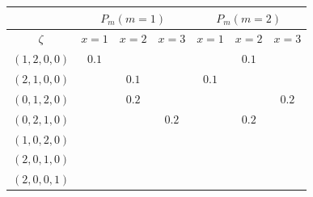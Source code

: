\documentclass[11pt,letterpaper]{article}
\begin{document}
\begin{table}[]
\begin{tabular}{c||ccc||ccc}
            & \multicolumn{3}{c||}{$P_m (m=1)$}                                                            & \multicolumn{3}{c}{$P_m (m=2)$}                                                                          \\ \hline
$\zeta$     & \multicolumn{1}{c|}{$x=1$}                                           & \multicolumn{1}{c|}{$x=2$}                    & $x=3$                    & \multicolumn{1}{c|}{$x=1$}                    & \multicolumn{1}{c|}{$x=2$}                    & $x=3$                    \\ \hline
$(1,2,0,0)$ & \multicolumn{1}{c|}{\cellcolor{yellow!25}$0.1$} & \multicolumn{1}{c|}{}                         &                          & \multicolumn{1}{c|}{}                         & \multicolumn{1}{c|}{\cellcolor{yellow!25}$0.1$} &                          \\ \hline
$(2,1,0,0)$ & \multicolumn{1}{c|}{}                                                & \multicolumn{1}{c|}{\cellcolor{yellow!25}$0.1$} &                          & \multicolumn{1}{c|}{\cellcolor{yellow!25}$0.1$} & \multicolumn{1}{c|}{}                         &                          \\ \hline
$(0,1,2,0)$ & \multicolumn{1}{c|}{}                                                & \multicolumn{1}{c|}{\cellcolor{yellow!25}$0.2$} &                          & \multicolumn{1}{c|}{}                         & \multicolumn{1}{c|}{}                         & \cellcolor{yellow!25}$0.2$ \\ \hline
$(0,2,1,0)$ & \multicolumn{1}{c|}{}                                                & \multicolumn{1}{c|}{}                         & \cellcolor{yellow!25}$0.2$ & \multicolumn{1}{c|}{}                         & \multicolumn{1}{c|}{\cellcolor{yellow!25}$0.2$} &                          \\ \hline
$(1,0,2,0)$ & \multicolumn{1}{c|}{\cellcolor{yellow!25}}                        & \multicolumn{1}{c|}{}                         &                          & \multicolumn{1}{c|}{}                         & \multicolumn{1}{c|}{}                         & \cellcolor{yellow!25} \\ \hline
$(2,0,1,0)$ & \multicolumn{1}{c|}{}                                                & \multicolumn{1}{c|}{}                         & \cellcolor{yellow!25} & \multicolumn{1}{c|}{\cellcolor{yellow!25}} & \multicolumn{1}{c|}{}                         &                          \\ \hline
$(2,0,0,1)$ & \multicolumn{1}{c|}{}                                                & \multicolumn{1}{c|}{}                         &                          & \multicolumn{1}{c|}{\cellcolor{yellow!25}} & \multicolumn{1}{c|}{}                         &                          \\ \hline

\end{tabular}
\end{table}
\end{document}
